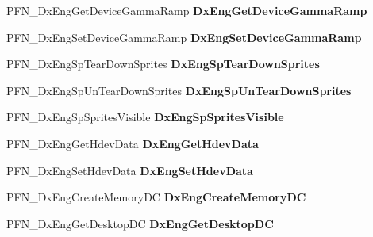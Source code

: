 \begin{DoxyCompactItemize}
P\+F\+N\+\_\+\+Dx\+Eng\+Get\+Device\+Gamma\+Ramp {\bfseries Dx\+Eng\+Get\+Device\+Gamma\+Ramp}
\item 
\mbox{\label{struct___d_x_e_n_g___f_u_n_c_t_i_o_n_s_a376e5b86f33ff198dd11a078adb96c59}} 
P\+F\+N\+\_\+\+Dx\+Eng\+Set\+Device\+Gamma\+Ramp {\bfseries Dx\+Eng\+Set\+Device\+Gamma\+Ramp}
\item 
\mbox{\label{struct___d_x_e_n_g___f_u_n_c_t_i_o_n_s_ad86c5668fe9dd59915579d1115351d15}} 
P\+F\+N\+\_\+\+Dx\+Eng\+Sp\+Tear\+Down\+Sprites {\bfseries Dx\+Eng\+Sp\+Tear\+Down\+Sprites}
\item 
\mbox{\label{struct___d_x_e_n_g___f_u_n_c_t_i_o_n_s_a0f144e0c4cf8d5981454ff0abbaef258}} 
P\+F\+N\+\_\+\+Dx\+Eng\+Sp\+Un\+Tear\+Down\+Sprites {\bfseries Dx\+Eng\+Sp\+Un\+Tear\+Down\+Sprites}
\item 
\mbox{\label{struct___d_x_e_n_g___f_u_n_c_t_i_o_n_s_aa7c406d7dd356e23c18d338a3e26817d}} 
P\+F\+N\+\_\+\+Dx\+Eng\+Sp\+Sprites\+Visible {\bfseries Dx\+Eng\+Sp\+Sprites\+Visible}
\item 
\mbox{\label{struct___d_x_e_n_g___f_u_n_c_t_i_o_n_s_a0d9d4c679f82d26cebe58ba9abdd9acf}} 
P\+F\+N\+\_\+\+Dx\+Eng\+Get\+Hdev\+Data {\bfseries Dx\+Eng\+Get\+Hdev\+Data}
\item 
\mbox{\label{struct___d_x_e_n_g___f_u_n_c_t_i_o_n_s_a7c11db7039c437ca9a976c1984083dee}} 
P\+F\+N\+\_\+\+Dx\+Eng\+Set\+Hdev\+Data {\bfseries Dx\+Eng\+Set\+Hdev\+Data}
\item 
\mbox{\label{struct___d_x_e_n_g___f_u_n_c_t_i_o_n_s_a4ff85423f2483449f3bf2f87b9e20c36}} 
P\+F\+N\+\_\+\+Dx\+Eng\+Create\+Memory\+DC {\bfseries Dx\+Eng\+Create\+Memory\+DC}
\item 
\mbox{\label{struct___d_x_e_n_g___f_u_n_c_t_i_o_n_s_a9e96f5fb3eb7367b17942525e6247094}} 
P\+F\+N\+\_\+\+Dx\+Eng\+Get\+Desktop\+DC {\bfseries Dx\+Eng\+Get\+Desktop\+DC}
\item 

\end{DoxyCompactItemize}

